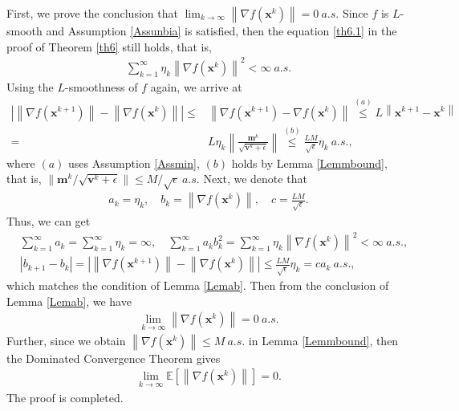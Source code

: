 \documentclass[twoside,11pt]{article}
\begin{document}
First, we prove the conclusion that $\lim_{k\rightarrow\infty} \left\| \nabla f(\mathbf{x}^k)\right\|=0\ a.s.$ Since $f$ is $L$-smooth and Assumption \ref{Assunbia} is satisfied, then the equation \eqref{th6.1} in the proof of Theorem \ref{th6} still holds, that is,
\begin{equation}
   	\begin{aligned}
   	\sum_{k=1}^{\infty}\eta_k\left\| \nabla f(\mathbf{x}^k)\right\|^2<\infty\ a.s.\nonumber
   	\end{aligned}
\end{equation}
Using the $L$-smoothness of $f$ again, we arrive at
\begin{equation}
   	\begin{aligned}
   	\left| \left\| \nabla f(\mathbf{x}^{k+1})\right\|-\left\| \nabla f(\mathbf{x}^{k})\right\| \right| 
   	\le&\left\| \nabla f(\mathbf{x}^{k+1})-\nabla f(\mathbf{x}^{k})\right\|
   	\overset{(a)}{\le} L\left\| \mathbf{x}^{k+1}-\mathbf{x}^{k}\right\| \\
   	=& L\eta_{k}\left\|  \frac{\mathbf{m}^k}{\sqrt{\mathbf{v}^k+\epsilon}} \right\|   
   	\overset{(b)}{\le} \frac{LM}{\sqrt{\epsilon}}\eta_{k}\ a.s.,\nonumber
   	\end{aligned}
\end{equation}
where $(a)$ uses Assumption \ref{Assmin}, $(b)$ holds by Lemma \ref{Lemmbound}, that is, $\| {\mathbf{m}^k}/{\sqrt{\mathbf{v}^k+\epsilon}}\| \le{M}/{\sqrt{\epsilon}}\ a.s.$ 
Next, we denote that
\begin{align*}
   	a_k=\eta_{k},\quad b_k= \left\| \nabla f(\mathbf{x}^{k})\right\|,\quad c=\frac{LM}{\sqrt{\epsilon}}.
\end{align*}
Thus, we can get 
\begin{align*}
   	&\sum_{k=1}^{\infty}a_k
   	=\sum_{k=1}^{\infty}\eta_{k}
   	=\infty, 
   	\quad 
   	\sum_{k=1}^{\infty}a_k b_k^2
   	=\sum_{k=1}^{\infty}\eta_k\left\| \nabla f(\mathbf{x}^k)\right\|^2<\infty\ a.s.,\\
   	&\left| b_{k+1}-b_{k}\right| 
   	=\left|\left\| \nabla f(\mathbf{x}^{k+1})\right\|-\left\| \nabla f(\mathbf{x}^{k})\right\| \right| 
   	\le \frac{LM}{\sqrt{\epsilon}}\eta_{k}
   	=c a_{k}
   	\ a.s.,
\end{align*}
which matches the condition of Lemma \ref{Lemab}. Then from the conclusion of Lemma \ref{Lemab}, we have
\begin{equation}
   	\begin{aligned}
   	\lim_{k\rightarrow\infty} \left\| \nabla f(\mathbf{x}^k)\right\|=0\ a.s.\nonumber
   	\end{aligned}
\end{equation}
Further, since we obtain $\left\| \nabla f(\mathbf{x}^k)\right\|\le M\ a.s.$ in Lemma \ref{Lemmbound}, then the Dominated Convergence Theorem \citep[see][chap.~2 Theorem 16]{galambos1995advanced} gives
\begin{equation}
   	\begin{aligned}
   	\lim_{k\rightarrow\infty} \mathbb{E}\left[\left\| \nabla f(\mathbf{x}^k)\right\|\right]=0.\nonumber
   	\end{aligned}
\end{equation}
The proof is completed.
\end{document}
